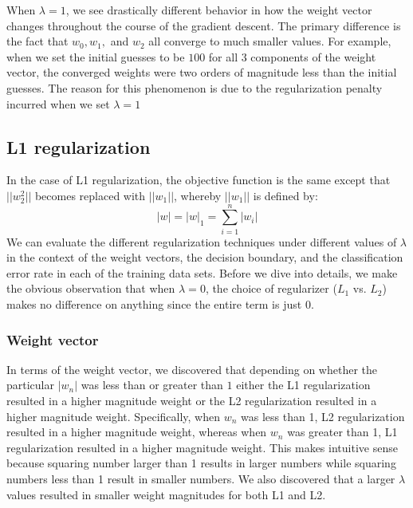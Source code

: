 \documentclass{article}
\begin{document}
When $\lambda = 1$, we see drastically different behavior in how the weight vector changes throughout the course of the gradient descent. The primary difference is the fact that $w_{0}, w_{1},$ and $w_{2}$ all converge to much smaller values. For example, when we set the initial guesses to be $100$ for all 3 components of the weight vector, the converged weights were two orders of magnitude less than the initial guesses. The reason for this phenomenon is due to the regularization penalty incurred when we set $\lambda = 1$

\subsection{L1 regularization}
In the case of L1 regularization, the objective function is the same except that $||w^2_2||$ becomes replaced with $||w_1||$, whereby $||w_1||$ is defined by:
$$|w| = |w|_1 = \sum_{i=1}^n |w_i|$$
We can evaluate the different regularization techniques under different values of $\lambda$ in the context of the weight vectors, the decision boundary, and the classification error rate in each of the training data sets. Before we dive into details, we make the obvious observation that when $\lambda = 0$, the choice of regularizer ($L_1$ vs. $L_2$) makes no difference on anything since the entire term is just $0$.

\subsubsection{Weight vector}
In terms of the weight vector, we discovered that depending on whether the particular $|w_n|$ was less than or greater than $1$ either the L1 regularization resulted in a higher magnitude weight or the L2 regularization resulted in a higher magnitude weight. Specifically, when $w_n$ was less than 1, L2 regularization resulted in a higher magnitude weight, whereas when $w_n$ was greater than 1, L1 regularization resulted in a higher magnitude weight.   This makes intuitive sense because squaring number larger than 1 results in larger numbers while squaring numbers less than 1 result in smaller numbers. We also discovered that a larger $\lambda$ values resulted in smaller weight magnitudes for both L1 and L2.
\end{document}
